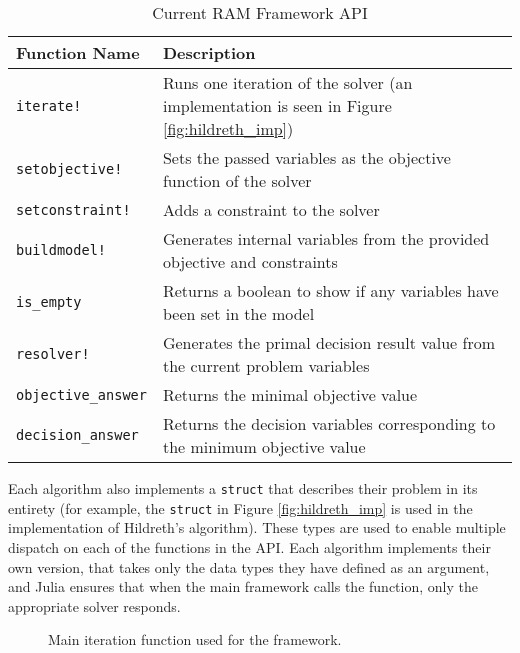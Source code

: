 \begin{table}[h]
\centering
\begin{tabular}{|l|p{11.5cm}|}
\hline
Function Name       & Description                                                                   \\ \hline
\texttt{iterate!}           & Runs one iteration of the solver (an implementation is seen in Figure \ref{fig:hildreth_imp}) \\ \hline
\texttt{setobjective!}      & Sets the passed variables as the objective function of the solver             \\ \hline
\texttt{setconstraint!}     & Adds a constraint to the solver                                               \\ \hline
\texttt{buildmodel!}        & Generates internal variables from the provided objective and constraints      \\ \hline
\texttt{is\_empty}          & Returns a boolean to show if any variables have been set in the model         \\ \hline
\texttt{resolver!}          & Generates the primal decision result value from the current problem variables \\ \hline
\texttt{objective\_answer}  & Returns the minimal objective value                                           \\ \hline
\texttt{decision\_answer}   & Returns the decision variables corresponding to the minimum objective value   \\ \hline
\end{tabular}
\caption{Current RAM Framework API}
\label{table:RAM_api}
\end{table}

Each algorithm also implements a \texttt{struct} that describes their problem in its entirety (for example, the \texttt{struct} in Figure \ref{fig:hildreth_imp} is used in the implementation of Hildreth's algorithm). These types are used to enable multiple dispatch on each of the functions in the API. Each algorithm implements their own version, that takes only the data types they have defined as an argument, and Julia ensures that when the main framework calls the function, only the appropriate solver responds. 

\begin{figure}[th]
    \centering
    
    \caption{Main iteration function used for the framework.}
    \label{fig:iterate_model!}
\end{figure}

